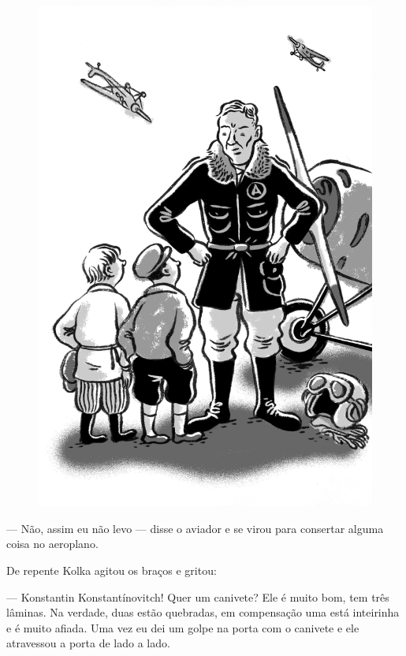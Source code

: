 \begin{figure}%
\vspace*{-2.525cm}
\hspace*{-2.75cm}\includegraphics{./imgs/cena15.jpg}
\end{figure}

--- Não, assim eu não levo --- disse o aviador e se virou para
consertar alguma coisa no aeroplano.

De repente Kolka agitou os braços e gritou:

--- Konstantin Konstantínovitch! Quer um canivete? Ele é muito bom, tem
três lâminas. Na verdade, duas estão quebradas, em compensação uma está
inteirinha e é muito afiada. Uma vez eu dei um golpe na porta com o
canivete e ele atravessou a porta de lado a lado.


